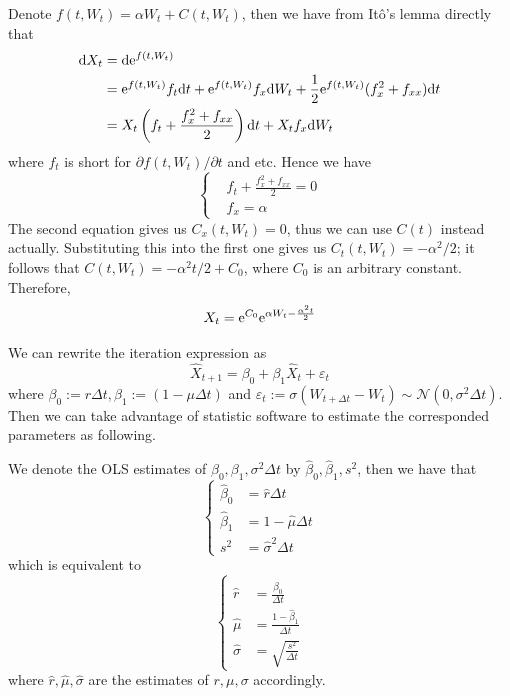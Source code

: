 \documentclass{homework}
\begin{document}
    \problem
    Denote $f(t,W_t)=\alpha W_t+C(t,W_t)$, then we have from
    It\^o's lemma directly that
    \[\begin{aligned}
        \mathrm d X_t&=\mathrm d \mathrm e^{f(t,W_t)}\\
        &=\mathrm e^{f(t,W_t)}f_t\mathrm d t+\mathrm e^{f(t,W_t)}f_x\mathrm d W_t
        +\frac{1}{2}\mathrm e^{f(t,W_t)}(f_x^2+f_{xx})\mathrm d t\\
        &=X_t\left(f_t+\frac{f_x^2+f_{xx}}{2}\right)\mathrm d t
        +X_tf_x\mathrm d W_t
    \end{aligned}\]
    where $f_t$ is short for $\partial f(t,W_t)/\partial t$ and etc.
    Hence we have
    \[\left\{\begin{aligned}
        &f_t+\frac{f_x^2+f_{xx}}{2}=0\\
        &f_x=\alpha
    \end{aligned}\right.\]
    The second equation gives us $C_x(t,W_t)=0$, thus we can use $C(t)$
    instead actually. Substituting this into the first one gives us
    $C_t(t,W_t)=-\alpha^2/2$; it follows that $C(t,W_t)=-\alpha^2 t/2+C_0$,
    where $C_0$ is an arbitrary constant.
    Therefore,
    \[X_t=\mathrm e^{C_0}\mathrm e^{\alpha W_t-\frac{\alpha^2t}{2}}\]

    \problem
    We can rewrite the iteration expression as
    \[\hat X_{t+1}=
    \beta_0+\beta_1\hat X_t
    +\varepsilon_t\]
    where $\beta_0:=r\Delta t,\beta_1:=(1-\mu\Delta t)$
    and $\varepsilon_t:=\sigma(W_{t+\Delta t}-W_t)
    \sim\mathcal N(0,\sigma^2\Delta t)$.
    Then we can take advantage of statistic software to
    estimate the corresponded parameters as following.

    We denote the OLS estimates of $\beta_0,\beta_1,\sigma^2\Delta t$
    by $\hat\beta_0,\hat\beta_1,s^2$, then we have that
    \[\left\{\begin{aligned}
        \hat\beta_0&=\hat r\Delta t\\
        \hat\beta_1&=1-\hat\mu\Delta t\\
        s^2&=\hat\sigma^2\Delta t
    \end{aligned}\right.\]
    which is equivalent to
    \[\left\{\begin{aligned}
        \hat r&=\frac{\hat\beta_0}{\Delta t}\\
        \hat\mu&=\frac{1-\hat\beta_1}{\Delta t}\\
        \hat\sigma&=\sqrt{\frac{s^2}{\Delta t}}
    \end{aligned}\right.\]
    where $\hat r,\hat\mu,\hat\sigma$ are the estimates of $r,\mu,\sigma$
    accordingly.
\end{document}
